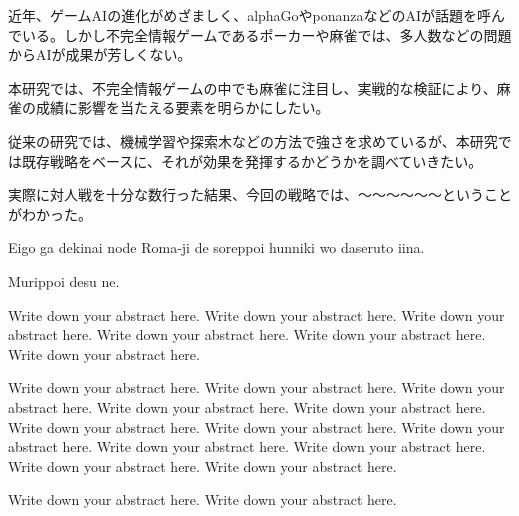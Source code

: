 
\begin{jabstract}

近年、ゲームAIの進化がめざましく、alphaGoやponanzaなどのAIが話題を呼んでいる。しかし不完全情報ゲームであるポーカーや麻雀では、多人数などの問題からAIが成果が芳しくない。

本研究では、不完全情報ゲームの中でも麻雀に注目し、実戦的な検証により、麻雀の成績に影響を当たえる要素を明らかにしたい。

従来の研究では、機械学習や探索木などの方法で強さを求めているが、本研究では既存戦略をベースに、それが効果を発揮するかどうかを調べていきたい。

実際に対人戦を十分な数行った結果、今回の戦略では、〜〜〜〜〜〜ということがわかった。

\end{jabstract}


\begin{eabstract}

Eigo ga dekinai node Roma-ji de soreppoi hunniki wo daseruto iina.

Murippoi desu ne.

Write down your abstract here. Write down your abstract here. Write down your abstract here. Write down your abstract here. Write down your abstract here. Write down your abstract here.

 Write down your abstract here. Write down your abstract here. Write down your abstract here. Write down your abstract here. Write down your abstract here. Write down your abstract here. Write down your abstract here. Write down your abstract here. Write down your abstract here. Write down your abstract here. Write down your abstract here. Write down your abstract here.

Write down your abstract here. Write down your abstract here.

\end{eabstract}
